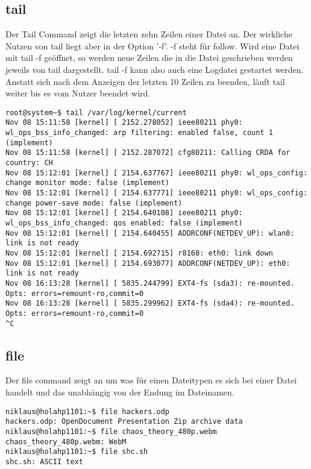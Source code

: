 \documentclass[10pt,paper=a4,final]{scrartcl}
\begin{document}
\subsection{tail}
Der Tail Command zeigt die letzten zehn Zeilen einer Datei an. Der wirkliche Nutzen von tail liegt aber in der Option '-f'. -f steht f\"ur follow. Wird eine Datei mit tail -f ge\"offnet, so werden neue Zeilen die in die Datei geschrieben werden jeweils von tail dargestellt. tail -f kann also auch eine Logdatei gestartet werden. Anstatt sich nach dem Anzeigen der letzten 10 Zeilen zu beenden, l\"auft tail weiter bis es vom Nutzer beendet wird.
\begin{lstlisting}[frame=single]
root@system~$ tail /var/log/kernel/current
Nov 08 15:11:58 [kernel] [ 2152.278052] ieee80211 phy0: wl_ops_bss_info_changed: arp filtering: enabled false, count 1 (implement)
Nov 08 15:11:58 [kernel] [ 2152.287072] cfg80211: Calling CRDA for country: CH
Nov 08 15:12:01 [kernel] [ 2154.637767] ieee80211 phy0: wl_ops_config: change monitor mode: false (implement)
Nov 08 15:12:01 [kernel] [ 2154.637771] ieee80211 phy0: wl_ops_config: change power-save mode: false (implement)
Nov 08 15:12:01 [kernel] [ 2154.640108] ieee80211 phy0: wl_ops_bss_info_changed: qos enabled: false (implement)
Nov 08 15:12:01 [kernel] [ 2154.640455] ADDRCONF(NETDEV_UP): wlan0: link is not ready
Nov 08 15:12:01 [kernel] [ 2154.692715] r8168: eth0: link down
Nov 08 15:12:01 [kernel] [ 2154.693077] ADDRCONF(NETDEV_UP): eth0: link is not ready
Nov 08 16:13:28 [kernel] [ 5835.244799] EXT4-fs (sda3): re-mounted. Opts: errors=remount-ro,commit=0
Nov 08 16:13:28 [kernel] [ 5835.299962] EXT4-fs (sda4): re-mounted. Opts: errors=remount-ro,commit=0
^C
\end{lstlisting}
\subsection{file}
Der file command zeigt an um was f\"ur einen Dateitypen es sich bei einer Datei handelt und das unabh\"angig von der Endung im Dateinamen.
\begin{lstlisting}[frame=single]
niklaus@holahp1101:~$ file hackers.odp 
hackers.odp: OpenDocument Presentation Zip archive data
niklaus@holahp1101:~$ file chaos_theory_480p.webm 
chaos_theory_480p.webm: WebM
niklaus@holahp1101:~$ file shc.sh 
shc.sh: ASCII text
\end{lstlisting}
\end{document}
